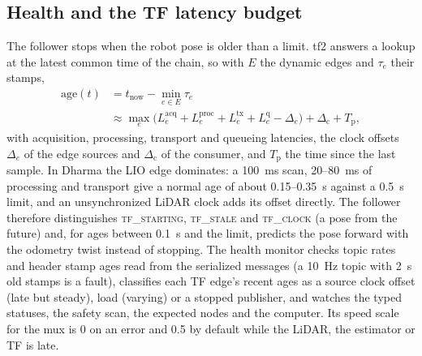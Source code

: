 \subsection{Health and the TF latency budget}
\label{sec:health}

The follower stops when the robot pose is older than a limit. tf2 answers a lookup at the
latest common time of the chain, so with $E$ the dynamic edges and $\tau_e$ their stamps,
\begin{equation}
  \begin{aligned}
    \mathrm{age}(t) &= t_{\mathrm{now}} - \min_{e \in E} \tau_e\\
    &\approx \max_{e}\big(L^{\mathrm{acq}}_e + L^{\mathrm{proc}}_e + L^{\mathrm{tx}}_e +
    L^{\mathrm{q}}_e - \Delta_e\big) + \Delta_{\mathrm{c}} + T_{\mathrm{p}},
  \end{aligned}
  \label{eq:tfage}
\end{equation}
with acquisition, processing, transport and queueing latencies, the clock offsets $\Delta_e$
of the edge sources and $\Delta_{\mathrm{c}}$ of the consumer, and $T_{\mathrm{p}}$ the time
since the last sample. In Dharma the LIO edge dominates: a 100~ms scan, 20--80~ms of processing and transport
give a normal age of about 0.15--0.35~s against a 0.5~s limit, and an unsynchronized LiDAR
clock adds its offset directly. The follower therefore distinguishes \textsc{tf\_starting},
\textsc{tf\_stale} and \textsc{tf\_clock} (a pose from the future) and, for ages between
0.1~s and the limit, predicts the pose forward with the odometry twist instead of stopping.
The health monitor checks topic rates and header stamp ages read from the serialized messages
(a 10~Hz topic with 2~s old stamps is a fault), classifies each TF edge's recent ages as a
source clock offset (late but steady), load (varying) or a stopped publisher, and watches the
typed statuses, the safety scan, the expected nodes and the computer. Its speed scale for the
mux is 0 on an error and 0.5 by default while the LiDAR, the estimator or TF is late.
